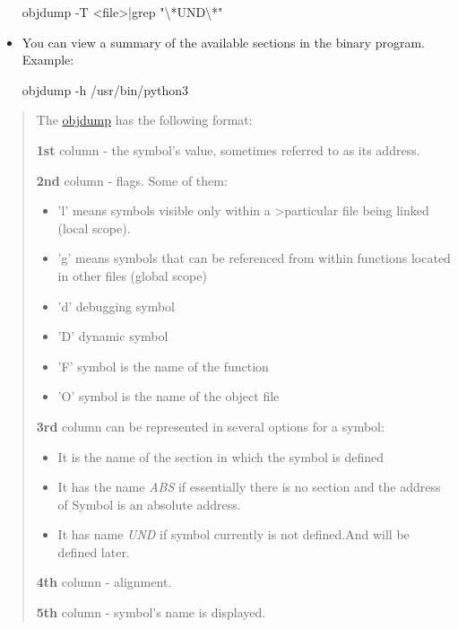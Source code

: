 \documentclass[
]{article}
\newenvironment{Shaded}{}{}
\newcommand{\AttributeTok}[1]{\textcolor[rgb]{0.49,0.56,0.16}{#1}}
\newcommand{\ExtensionTok}[1]{#1}
\newcommand{\NormalTok}[1]{#1}
\newcommand{\OperatorTok}[1]{\textcolor[rgb]{0.40,0.40,0.40}{#1}}
\newcommand{\StringTok}[1]{\textcolor[rgb]{0.25,0.44,0.63}{#1}}
\begin{document}
\begin{itemize}
\begin{Shaded}
\begin{Highlighting}[]
\ExtensionTok{objdump} \AttributeTok{{-}T} \OperatorTok{\textless{}}\NormalTok{file}\OperatorTok{\textgreater{}|}\NormalTok{grep }\StringTok{"\textbackslash{}*UND\textbackslash{}*"}
\end{Highlighting}
\end{Shaded}
\item
  You can view a summary of the available sections in the binary
  program. Example:

\begin{Shaded}
\begin{Highlighting}[]
\ExtensionTok{objdump} \AttributeTok{{-}h}\NormalTok{ /usr/bin/python3}
\end{Highlighting}
\end{Shaded}
\end{itemize}

\begin{quote}
The \href{https://man7.org/linux/man-pages/man1/objdump.1.html}{objdump}
has the following format:

\textbf{1st} column - the symbol's value, sometimes referred to as its
address.

\textbf{2nd} column - flags. Some of them:

\begin{itemize}
\item
  'l' means symbols visible only within a \textgreater particular file
  being linked (local scope).
\item
  'g' means symbols that can be referenced from within functions located
  in other files (global scope)
\item
  'd' debugging symbol
\item
  'D' dynamic symbol
\item
  'F' symbol is the name of the function
\item
  'O' symbol is the name of the object file
\end{itemize}

\textbf{3rd} column can be represented in several options for a symbol:

\begin{itemize}
\item
  It is the name of the section in which the symbol is defined
\item
  It has the name \emph{ABS} if essentially there is no section and the
  address of Symbol is an absolute address.
\item
  It has name \emph{UND} if symbol currently is not defined.And will be
  defined later.
\end{itemize}

\textbf{4th} column - alignment.

\textbf{5th} column - symbol's name is displayed.
\end{quote}
\end{document}
